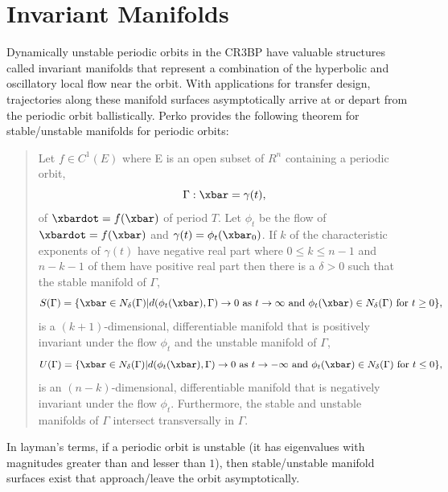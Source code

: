 \section{Invariant Manifolds}\label{sec:InvariantManifolds}
Dynamically unstable periodic orbits in the CR3BP have valuable structures called invariant
manifolds that represent a combination of the hyperbolic and oscillatory local flow near the orbit.
With applications for transfer design, trajectories along these manifold surfaces asymptotically
arrive at or depart from the periodic orbit ballistically. Perko provides the following theorem for
stable/unstable manifolds for periodic orbits\cite{Perko:1991}:
\begin{quote}
    Let $f\in C^{1}(E)$ where E is an open subset of $R^{n}$ containing a periodic orbit,
    \begin{equation}
        \Gamma:\xbar=\gamma(t),
    \end{equation}
    of $\xbardot=f(\xbar)$ of period $T$. Let $\phi_{t}$ be the flow of $\xbardot=f(\xbar)$ and
    $\gamma(t)=\phi_{t}(\xbar_{0})$. If $k$ of the characteristic exponents of $\gamma(t)$ have
    negative real part where $0\leq k\leq n-1$ and $n-k-1$ of them have positive real part then
    there is a $\delta>0$ such that the stable manifold of $\Gamma$,
    \begin{equation}
        S(\Gamma)=\{\xbar\in N_{\delta}(\Gamma)|d(\phi_{t}(\xbar),\Gamma)\rightarrow0\text{ as }t\rightarrow\infty\text{ and }\phi_{t}(\xbar)\in N_{\delta}(\Gamma)\text{ for }t\geq0\},
    \end{equation}
    is a $(k+1)$-dimensional, differentiable manifold that is positively invariant under the flow
    $\phi_{t}$ and the unstable manifold of $\Gamma$,
    \begin{equation}
        U(\Gamma)=\{\xbar\in N_{\delta}(\Gamma)|d(\phi_{t}(\xbar),\Gamma)\rightarrow0\text{ as }t\rightarrow-\infty\text{ and }\phi_{t}(\xbar)\in N_{\delta}(\Gamma)\text{ for }t\leq0\},
    \end{equation}
    is an $(n-k)$-dimensional, differentiable manifold that is negatively invariant under the flow
    $\phi_{t}$. Furthermore, the stable and unstable manifolds of $\Gamma$ intersect transversally
    in $\Gamma$.
\end{quote}
In layman's terms, if a periodic orbit is unstable (it has eigenvalues with magnitudes greater than
and lesser than $1$), then stable/unstable manifold surfaces exist that approach/leave the orbit
asymptotically.

